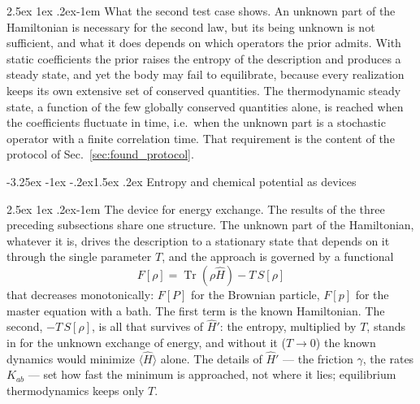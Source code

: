 \documentclass[10pt,a4paper]{article}
\makeatletter
\renewcommand{\subsection}{\@startsection{subsection}{2}{\z@}%
  {-3.25ex \@plus -1ex \@minus -.2ex}{1.5ex \@plus .2ex}%
  {\normalfont\fontsize{15.5pt}{19pt}\selectfont\bfseries}}
\renewcommand{\paragraph}{\@startsection{paragraph}{4}{\z@}%
  {2.5ex \@plus 1ex \@minus .2ex}{-1em}%
  {\normalfont\fontsize{14pt}{17pt}\selectfont\bfseries}}
\newcommand{\Tr}{\operatorname{Tr}}
\makeatother
\begin{document}
\paragraph{What the second test case shows.}
An unknown part of the Hamiltonian is necessary for the second law, but its being unknown is not sufficient, and what it does depends on which operators the prior admits.
With static coefficients the prior raises the entropy of the description and produces a steady state, and yet the body may fail to equilibrate, because every realization keeps its own extensive set of conserved quantities.
The thermodynamic steady state, a function of the few globally conserved quantities alone, is reached when the coefficients fluctuate in time, i.e.\ when the unknown part is a stochastic operator with a finite correlation time.
That requirement is the content of the protocol of Sec.~\ref{sec:found_protocol}.

\subsection{Entropy and chemical potential as devices}
\label{sec:found_info}

\paragraph{The device for energy exchange.}
The results of the three preceding subsections share one structure.
The unknown part of the Hamiltonian, whatever it is, drives the description to a stationary state that depends on it through the single parameter $ T $, and the approach is governed by a functional
\[
  F[\rho] = \Tr(\rho\hat H) - T\,S[\rho]
\]
that decreases monotonically: $ F[P] $ for the Brownian particle, $ F[p] $ for the master equation with a bath.
The first term is the known Hamiltonian.
The second, $ -T\,S[\rho] $, is all that survives of $ \hat H' $: the entropy, multiplied by $ T $, stands in for the unknown exchange of energy, and without it ($ T \to 0 $) the known dynamics would minimize $ \langle\hat H\rangle $ alone.
The details of $ \hat H' $ --- the friction $ \gamma $, the rates $ K_{ab} $ --- set how fast the minimum is approached, not where it lies; equilibrium thermodynamics keeps only $ T $.
\end{document}
